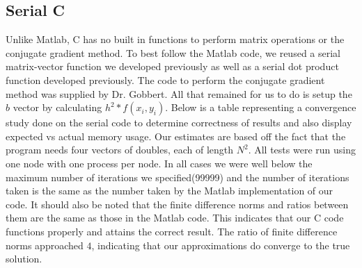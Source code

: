 \documentclass[11pt]{article}
\begin{document}
\subsection{Serial C}
Unlike Matlab, C has no built in functions to perform matrix operations or the conjugate gradient method. To best follow the Matlab code, we reused a serial matrix-vector function we developed previously as well as a serial dot product function developed previously. The code to perform the conjugate gradient method was supplied by Dr. Gobbert. All that remained for us to do is setup the $b$ vector by calculating $h^2 * f(x_i, y_i)$. Below is a table representing a convergence study done on the serial code to determine correctness of results and also display expected vs actual memory usage. Our estimates are based off the fact that the program needs four vectors of doubles, each of length $N^2$. All tests were run using one node with one process per node. In all cases we were well below the maximum number of iterations we specified(99999) and the number of iterations taken is the same as the number taken by the Matlab implementation of our code. It should also be noted that the finite difference norms and ratios between them are the same as those in the Matlab code. This indicates that our C code functions properly and attains the correct result. The ratio of finite difference norms approached $4$, indicating that our approximations do converge to the true solution.
\end{document}
